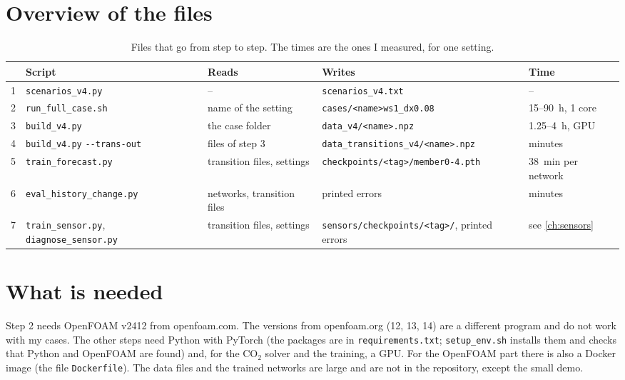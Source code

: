 \section{Overview of the files}
\begin{table}[h]
  \centering
  \caption[Files that go from step to step.]{Files that go from step to step. The times are the ones I measured, for one setting.}
  \label{tab:flowfiles}
  \footnotesize
  \begin{tabular}{p{0.4cm}p{2.9cm}p{3.2cm}p{3.2cm}p{2.4cm}}
    \toprule
    & Script & Reads & Writes & Time\\
    \midrule
    1 & \texttt{scenarios\_\allowbreak v4.py} & -- & \texttt{scenarios\_\allowbreak v4.txt} & --\\
    2 & \texttt{run\_\allowbreak full\_\allowbreak case.sh} & name of the setting & \texttt{cases/\allowbreak <name>ws1\_\allowbreak dx0.08} & 15--90~h, 1 core\\
    3 & \texttt{build\_v4.py} & the case folder & \texttt{data\_v4/\allowbreak <name>.npz} & 1.25--4~h, GPU\\
    4 & \texttt{build\_v4.py} \texttt{-{}-trans-out} & files of step 3 & \texttt{data\_\allowbreak transitions\_\allowbreak v4/\allowbreak <name>.npz} & minutes\\
    5 & \texttt{train\_\allowbreak forecast.py} & transition files, settings & \texttt{checkpoints/\allowbreak <tag>/\allowbreak member0-4.pth} & 38~min per network\\
    6 & \texttt{eval\_\allowbreak history\_\allowbreak change.py} & networks, transition files & printed errors & minutes\\
    7 & \texttt{train\_\allowbreak sensor.py}, \texttt{diagnose\_\allowbreak sensor.py} & transition files, settings & \texttt{sensors/\allowbreak checkpoints/\allowbreak <tag>/}, printed errors & see \cref{ch:sensors}\\
    \bottomrule
  \end{tabular}
\end{table}

\section{What is needed}
Step 2 needs OpenFOAM v2412 from openfoam.com. The versions from openfoam.org (12, 13, 14) are a different program and do not
work with my cases. The other steps need Python with PyTorch (the packages are in \texttt{requirements.txt}; \texttt{setup\_env.sh}
installs them and checks that Python and OpenFOAM are found) and, for the CO$_2$ solver and the training, a GPU. For the
OpenFOAM part there is also a Docker image (the file \texttt{Dockerfile}). The data files and the trained networks are large and are not
in the repository, except the small demo.

